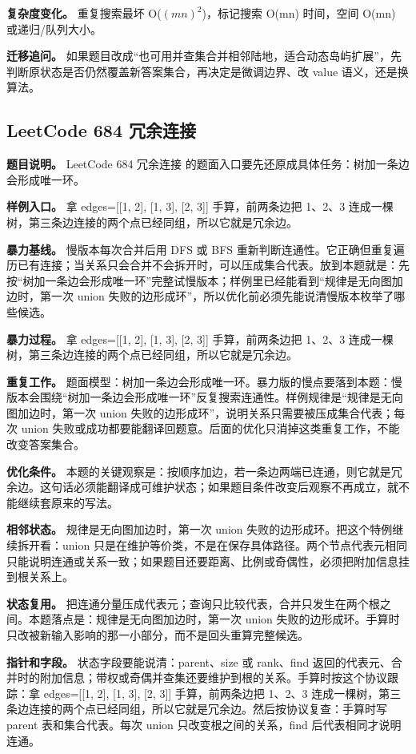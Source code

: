 \textbf{复杂度变化。} 重复搜索最坏 O(\ensuremath{(mn)^{2}})，标记搜索 O(mn) 时间，空间 O(mn) 或递归/队列大小。

\textbf{迁移追问。} 如果题目改成“也可用并查集合并相邻陆地，适合动态岛屿扩展”，先判断原状态是否仍然覆盖新答案集合，再决定是微调边界、改 value 语义，还是换算法。

\subsection{LeetCode 684 冗余连接}

\textbf{题目说明。} LeetCode 684 冗余连接 的题面入口要先还原成具体任务：树加一条边会形成唯一环。

\textbf{样例入口。} 拿 edges=[[1, 2], [1, 3], [2, 3]] 手算，前两条边把 1、2、3 连成一棵树，第三条边连接的两个点已经同组，所以它就是冗余边。

\textbf{暴力基线。} 慢版本每次合并后用 DFS 或 BFS 重新判断连通性。它正确但重复遍历已有连接；当关系只会合并不会拆开时，可以压成集合代表。放到本题就是：先按“树加一条边会形成唯一环”完整试慢版本；样例里已经能看到“规律是无向图加边时，第一次 union 失败的边形成环”，所以优化前必须先能说清慢版本枚举了哪些候选。

\textbf{暴力过程。} 拿 edges=[[1, 2], [1, 3], [2, 3]] 手算，前两条边把 1、2、3 连成一棵树，第三条边连接的两个点已经同组，所以它就是冗余边。

\textbf{重复工作。} 题面模型：树加一条边会形成唯一环。暴力版的慢点要落到本题：慢版本会围绕“树加一条边会形成唯一环”反复搜索连通性。样例规律是“规律是无向图加边时，第一次 union 失败的边形成环”，说明关系只需要被压成集合代表；每次 union 失败或成功都要能翻译回题意。后面的优化只消掉这类重复工作，不能改变答案集合。

\textbf{优化条件。} 本题的关键观察是：按顺序加边，若一条边两端已连通，则它就是冗余边。这句话必须能翻译成可维护状态；如果题目条件改变后观察不再成立，就不能继续套原来的写法。

\textbf{相邻状态。} 规律是无向图加边时，第一次 union 失败的边形成环。把这个特例继续拆开看：union 只是在维护等价类，不是在保存具体路径。两个节点代表元相同只能说明连通或关系一致；如果题目还要距离、比例或奇偶性，必须把附加信息挂到根关系上。

\textbf{状态复用。} 把连通分量压成代表元；查询只比较代表，合并只发生在两个根之间。本题落点是：规律是无向图加边时，第一次 union 失败的边形成环。手算时只改被新输入影响的那一小部分，而不是回头重算完整候选。

\textbf{指针和字段。} 状态字段要能说清：parent、size 或 rank、find 返回的代表元、合并时的附加信息；带权或奇偶并查集还要维护到根的关系。手算时按这个协议跟踪：拿 edges=[[1, 2], [1, 3], [2, 3]] 手算，前两条边把 1、2、3 连成一棵树，第三条边连接的两个点已经同组，所以它就是冗余边。然后按协议复查：手算时写 parent 表和集合代表。每次 union 只改变根之间的关系，find 后代表相同才说明连通。

